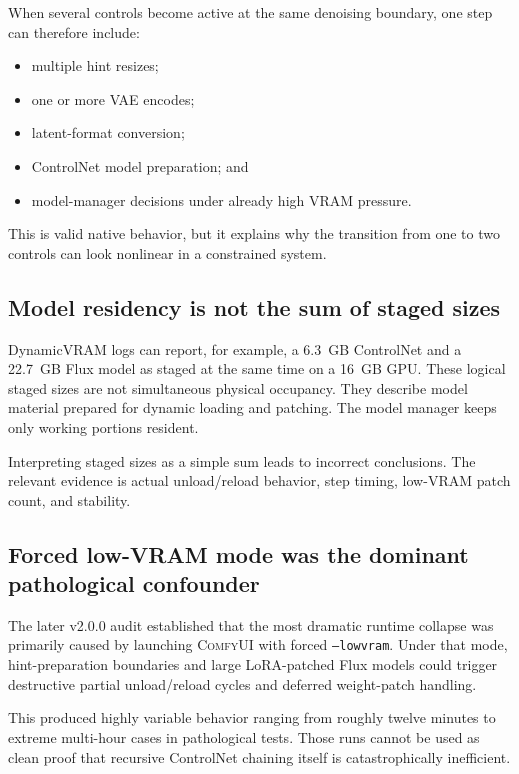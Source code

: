 \documentclass[11pt]{article}
\newcommand{\ComfyUI}{\textsc{ComfyUI}}
\newcommand{\code}[1]{\texttt{#1}}
\begin{document}
When several controls become active at the same denoising boundary, one step can therefore include:

\begin{itemize}
  \item multiple hint resizes;
  \item one or more VAE encodes;
  \item latent-format conversion;
  \item ControlNet model preparation; and
  \item model-manager decisions under already high VRAM pressure.
\end{itemize}

This is valid native behavior, but it explains why the transition from one to two controls can look nonlinear in a constrained system.

\subsection{Model residency is not the sum of staged sizes}

DynamicVRAM logs can report, for example, a 6.3~GB ControlNet and a 22.7~GB Flux model as staged at the same time on a 16~GB GPU. These logical staged sizes are not simultaneous physical occupancy. They describe model material prepared for dynamic loading and patching. The model manager keeps only working portions resident.

Interpreting staged sizes as a simple sum leads to incorrect conclusions. The relevant evidence is actual unload/reload behavior, step timing, low-VRAM patch count, and stability.

\subsection{Forced low-VRAM mode was the dominant pathological confounder}

The later v2.0.0 audit established that the most dramatic runtime collapse was primarily caused by launching \ComfyUI{} with forced \code{--lowvram}. Under that mode, hint-preparation boundaries and large LoRA-patched Flux models could trigger destructive partial unload/reload cycles and deferred weight-patch handling.

This produced highly variable behavior ranging from roughly twelve minutes to extreme multi-hour cases in pathological tests. Those runs cannot be used as clean proof that recursive ControlNet chaining itself is catastrophically inefficient.
\end{document}

